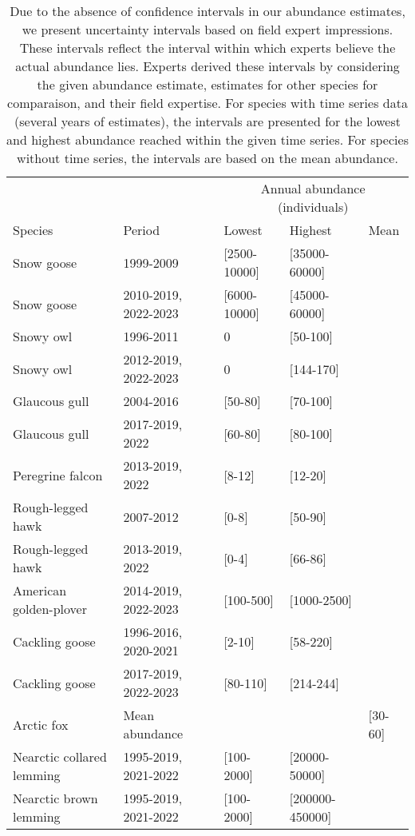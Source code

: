 \begin{table}[ht]
\centering
\caption{Due to the absence of confidence intervals in our abundance estimates, we present uncertainty intervals based on field expert impressions. These intervals reflect the interval within which experts believe the actual abundance lies. Experts derived these intervals by considering the given abundance estimate, estimates for other species for comparaison, and their field expertise. For species with time series data (several years of estimates), the intervals are presented for the lowest and highest abundance reached within the given time series. For species without time series, the intervals are based on the mean abundance.} 
\begingroup\fontsize{10pt}{8pt}\selectfont
\begin{tabularx}{\textwidth}{lllll}
  \hline
  & &\multicolumn{3}{c}{Annual abundance (individuals)} \\
 Species & Period & Lowest & Highest & Mean \\
 \hline
Snow goose & 1999-2009 & [2500-10000] & [35000-60000] &  \\ 
  Snow goose & 2010-2019, 2022-2023 & [6000-10000] & [45000-60000] &  \\ 
  Snowy owl & 1996-2011 & 0 & [50-100] &  \\ 
  Snowy owl & 2012-2019, 2022-2023 & 0 & [144-170] &  \\ 
  Glaucous gull & 2004-2016 & [50-80] & [70-100] &  \\ 
  Glaucous gull & 2017-2019, 2022 & [60-80] & [80-100] &  \\ 
  Peregrine falcon & 2013-2019, 2022 & [8-12] & [12-20] &  \\ 
  Rough-legged hawk & 2007-2012 & [0-8] & [50-90] &  \\ 
  Rough-legged hawk & 2013-2019, 2022 & [0-4] & [66-86] &  \\ 
  American golden-plover & 2014-2019, 2022-2023 & [100-500] & [1000-2500] &  \\ 
  Cackling goose & 1996-2016, 2020-2021 & [2-10] & [58-220] &  \\ 
  Cackling goose & 2017-2019, 2022-2023 & [80-110] & [214-244] &  \\ 
  Arctic fox & Mean abundance &  &  & [30-60] \\ 
  Nearctic collared lemming & 1995-2019, 2021-2022 & [100-2000] & [20000-50000] &  \\ 
  Nearctic brown lemming & 1995-2019, 2021-2022 & [100-2000] & [200000-450000] &  \\ 

\end{tabularx}
\end{table}
